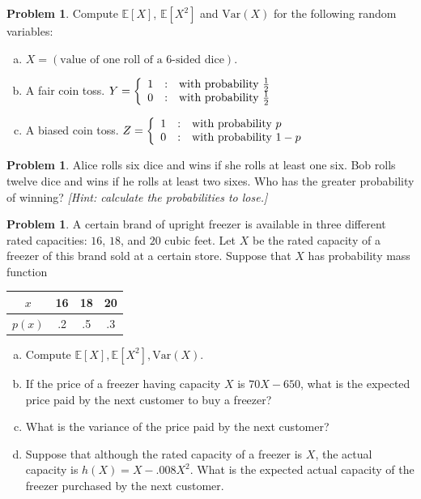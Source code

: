 \documentclass[10pt]{article}
\theoremstyle{definition}
\newtheorem{problem}[theorem]{Problem}
\newcommand{\1}[1]{\textbf{1}_{\left[#1\right]}} %
\def\E{\mathbb{E}} %
\def\Var{\mathrm{Var}} %
\begin{document}
\begin{problem}
  Compute $\E\left[X \right]$, $\E\left[X^{2} \right]$ and $\Var(X)$ for the
  following random variables:
  \begin{enumerate}[(a)]
    \item $X = (\text{value of one roll of a 6-sided dice})$.
    \item A fair coin toss.
    $Y = \left\{ \begin{array}{l@{\quad:\quad}l} 1 & \text{with probability
        }\frac{1}{2}\\0 & \text{with probability
        }\frac{1}{2} \end{array}\right.$
    \item A biased coin toss. $Z = \left\{ \begin{array}{l@{\quad:\quad}l} 1 &  \text{with
          probability }p\\0 & \text{with probability }1-p \end{array}\right.$
  \end{enumerate}
\end{problem}


\begin{problem}%
  Alice rolls six dice and wins if she rolls at least one six. Bob rolls
  twelve dice and wins if he rolls at least two sixes. Who has the greater
  probability of winning? \textit{[Hint: calculate the probabilities to lose.]}
\end{problem}



\begin{problem}
  A certain brand of upright freezer is available in three different rated
  capacities: $16$,  $18$, and $20$ cubic feet. Let $X$ be the rated capacity
  of a freezer of this brand sold at a certain store. Suppose that $X$ has
  probability mass function
  \begin{center}
    \begin{tabular}[c]{c|ccc}
      $x$&16&18&20\\ 
      \hline
      $p(x)$&.2&.5&.3 
    \end{tabular}
  \end{center}
  \begin{enumerate}[(a)]
    \item Compute $\E\left[X \right], \E\left[X^{2} \right], \Var(X)$.
    \item If the price of a freezer having capacity $X$ is $70X-650$, what is
    the expected price paid by the next customer to buy a freezer?
    \item What is the variance of the price paid by the next customer?
    \item Suppose that although the rated capacity of a freezer is $X$, the
    actual capacity is $h(X)=X-.008X^{2}$. What is the expected actual
    capacity of the freezer purchased by the next customer.
  \end{enumerate}
\end{problem}
\end{document}
